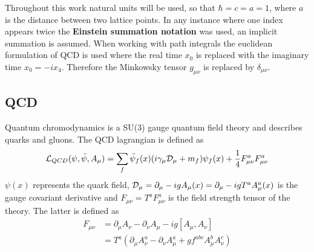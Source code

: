 Throughout this work natural units will be used, so that $\hbar = c = a = 1$, where $a$ is the distance between two lattice points.	In any instance where one index appears twice the \textbf{Einstein summation notation} was used, an implicit summation is assumed. When working with path integrals the euclidean formulation of QCD is used where the real time $x_0$ is replaced with the imaginary time $x_0 = -ix_4$. Therefore the Minkowsky tensor $g_{\mu\nu}$ is replaced by $\delta_{\mu\nu}$.
	
\subsection{QCD}
	Quantum chromodynamics is a SU(3) gauge quantum field theory and describes quarks and gluons. The QCD lagrangian is defined as \cite{qcd1_script_philipsen}
	\begin{equation}
	    \mathcal{L}_{QCD}(\psi,\bar{\psi},A_\mu) = \sum_f \bar{\psi}_f(x)(i\gamma_\mu\mathcal{D}_\mu + m_f)\psi_f(x) + \frac{1}{4}F^a_{\mu\nu}F^a_{\mu\nu}
	    \label{qcd_lagrangian}
	\end{equation}
	$\psi(x)$ represents the quark field, $\mathcal{D}_\mu = \partial_\mu - igA_\mu(x) = \partial_\mu-igT^aA^a_\mu(x)$ is the gauge covariant derivative and $F_{\mu\nu} = T^aF^a_{\mu\nu}$ is the field strength tensor of the theory. The latter is defined as
	\begin{equation}\label{strenth_tensor}
	\begin{aligned}
	    F_{\mu\nu} &= \partial_\mu A_\nu - \partial_\nu A_\mu-ig[A_\mu,A_\nu]\\
	    &= T^a(\partial_\mu A^a_\nu - \partial_\nu A^a_\mu + g f^{abc}A^b_\mu A^c_\nu)
	\end{aligned}
	\end{equation}
	

